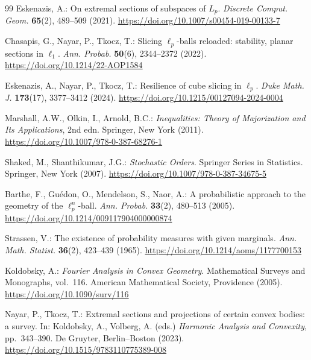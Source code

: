\documentclass[pdflatex,sn-mathphys-num]{sn-jnl}
\numberwithin{equation}{section}
\theoremstyle{thmstyleone}
\theoremstyle{thmstylethree}
\newcommand{\1}{\mathbf{1}}
\begin{document}
\begin{thebibliography}{99}
Eskenazis, A.:
On extremal sections of subspaces of $L_p$.
\emph{Discrete Comput. Geom.} \textbf{65}(2), 489--509 (2021).
\url{https://doi.org/10.1007/s00454-019-00133-7}

Chasapis, G., Nayar, P., Tkocz, T.:
Slicing $\ell_p$-balls reloaded: stability, planar sections in $\ell_1$.
\emph{Ann. Probab.} \textbf{50}(6), 2344--2372 (2022).
\url{https://doi.org/10.1214/22-AOP1584}

Eskenazis, A., Nayar, P., Tkocz, T.:
Resilience of cube slicing in $\ell_p$.
\emph{Duke Math. J.} \textbf{173}(17), 3377--3412 (2024).
\url{https://doi.org/10.1215/00127094-2024-0004}

Marshall, A.W., Olkin, I., Arnold, B.C.:
\emph{Inequalities: Theory of Majorization and Its Applications}, 2nd edn.
Springer, New York (2011).
\url{https://doi.org/10.1007/978-0-387-68276-1}

Shaked, M., Shanthikumar, J.G.:
\emph{Stochastic Orders}.
Springer Series in Statistics. Springer, New York (2007).
\url{https://doi.org/10.1007/978-0-387-34675-5}

Barthe, F., Gu\'edon, O., Mendelson, S., Naor, A.:
A probabilistic approach to the geometry of the $\ell_p^n$-ball.
\emph{Ann. Probab.} \textbf{33}(2), 480--513 (2005).
\url{https://doi.org/10.1214/009117904000000874}

Strassen, V.:
The existence of probability measures with given marginals.
\emph{Ann. Math. Statist.} \textbf{36}(2), 423--439 (1965).
\url{https://doi.org/10.1214/aoms/1177700153}

Koldobsky, A.:
\emph{Fourier Analysis in Convex Geometry}.
Mathematical Surveys and Monographs, vol.~116. American Mathematical Society,
Providence (2005).
\url{https://doi.org/10.1090/surv/116}

Nayar, P., Tkocz, T.:
Extremal sections and projections of certain convex bodies: a survey.
In: Koldobsky, A., Volberg, A. (eds.) \emph{Harmonic Analysis and Convexity},
pp.~343--390. De Gruyter, Berlin--Boston (2023).
\url{https://doi.org/10.1515/9783110775389-008}

\end{thebibliography}
\end{document}
